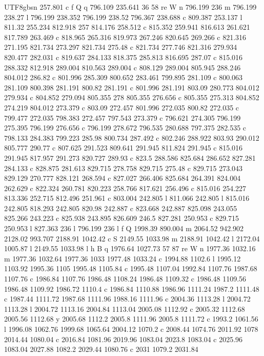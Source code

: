 \documentclass[11pt,a4paper,oneside]{report}
\begin{document}
\begin{CJK*}{UTF8}{gbsn}
{257.801 c f Q q 796.109 235.641 36 58 re W n 796.199 236 m 796.199 238.27 l 796.199 238.352 796.199
238.52 796.367 238.688 c 809.387 253.137 l 811.32 255.234 812.918 257 814.176 258.512 c 815.352 259.941
816.613 261.621 817.789 263.469 c 818.965 265.316 819.973 267.246 820.645 269.266 c 821.316 271.195
821.734 273.297 821.734 275.48 c 821.734 277.746 821.316 279.934 820.477 282.031 c 819.637 284.133
818.375 285.813 816.695 287.07 c 815.016 288.332 812.918 289.004 810.563 289.004 c 808.129 289.004
805.945 288.246 804.012 286.82 c 801.996 285.309 800.652 283.461 799.895 281.109 c 800.063 281.109
800.398 281.191 800.82 281.191 c 801.996 281.191 803.09 280.773 804.012 279.934 c 804.852 279.094 805.355
278 805.355 276.656 c 805.355 275.313 804.852 274.219 804.012 273.379 c 803.09 272.457 801.996 272.035
800.82 272.035 c 799.477 272.035 798.383 272.457 797.543 273.379 c 796.621 274.305 796.199 275.395
796.199 276.656 c 796.199 278.672 796.535 280.688 797.375 282.535 c 798.133 284.383 799.223 285.98
800.734 287.492 c 802.246 288.922 803.93 290.012 805.777 290.77 c 807.625 291.523 809.641 291.945 811.824
291.945 c 815.016 291.945 817.957 291.273 820.727 289.93 c 823.5 288.586 825.684 286.652 827.281 284.133
c 828.875 281.613 829.715 278.758 829.715 275.48 c 829.715 273.043 829.129 270.777 828.121 268.594 c
827.027 266.406 825.684 264.391 824.004 262.629 c 822.324 260.781 820.223 258.766 817.621 256.496 c
815.016 254.227 813.336 252.715 812.496 251.961 c 803.004 242.805 l 811.066 242.805 l 815.016 242.805
818.293 242.805 820.98 242.887 c 823.668 242.887 825.098 243.055 825.266 243.223 c 825.938 243.895
826.609 246.5 827.281 250.953 c 829.715 250.953 l 827.363 236 l 796.199 236 l f Q 1998.39 890.004 m
2064.52 942.902 2128.02 993.707 2188.91 1042.42 c S 2149.55 1033.98 m 2188.91 1042.42 l 2172.04 1005.87 l
2149.55 1033.98 l h B q 1976.64 1027.73 57 87 re W n 1977.36 1032.16 m 1977.36 1032.64 1977.36 1033
1977.48 1033.24 c 1994.88 1102.6 l 1995.12 1103.92 1995.36 1105 1995.48 1105.84 c 1995.48 1107.04 1992.84
1107.76 1987.68 1107.76 c 1986.84 1107.76 1986.48 1108.24 1986.48 1109.32 c 1986.48 1109.56 1986.48
1109.92 1986.72 1110.4 c 1986.84 1110.88 1986.96 1111.24 1987.2 1111.48 c 1987.44 1111.72 1987.68 1111.96
1988.16 1111.96 c 2004.36 1113.28 l 2004.72 1113.28 l 2004.72 1113.16 2004.84 1113.04 2005.08 1112.92 c
2005.32 1112.68 2005.56 1112.68 y 2005.68 1112.2 2005.8 1111.96 2005.8 1111.72 c 1993.2 1061.56 l 1996.08
1062.76 1999.68 1065.64 2004.12 1070.2 c 2008.44 1074.76 2011.92 1078 2014.44 1080.04 c 2016.84 1081.96
2019.96 1083.04 2023.8 1083.04 c 2025.96 1083.04 2027.88 1082.2 2029.44 1080.76 c 2031 1079.2 2031.84
}
\end{CJK*}
\end{document}
